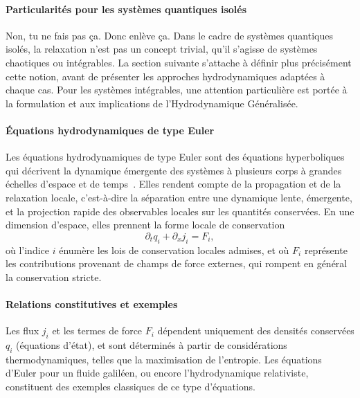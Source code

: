 \paragraph{Particularités pour les systèmes quantiques isolés}  
{\color{blue} Non, tu ne fais pas ça. Donc enlève ça.}
Dans le cadre de systèmes quantiques isolés, la relaxation n’est pas un concept trivial, qu’il s’agisse de systèmes chaotiques ou intégrables. La section suivante s’attache à définir plus précisément cette notion, avant de présenter les approches hydrodynamiques adaptées à chaque cas. Pour les systèmes intégrables, une attention particulière est portée à la formulation et aux implications de l’Hydrodynamique Généralisée.

\paragraph{Équations hydrodynamiques de type Euler}  
Les équations hydrodynamiques de type Euler sont des équations hyperboliques qui décrivent la dynamique émergente des systèmes à plusieurs corps à grandes échelles d’espace et de temps~\cite{ref1}. Elles rendent compte de la propagation {\color{blue} et } de la relaxation locale, c’est-à-dire la séparation entre une dynamique lente, émergente, et la projection rapide des observables locales sur les quantités conservées. En une dimension d’espace, elles prennent la forme locale de conservation
\begin{equation}\label{chap:GHD:eq.conserv.1}
	\partial_t q_i + \partial_x j_i = F_i,	
\end{equation}
où l’indice $i$ énumère les lois de conservation locales admises, et où $F_i$ représente les contributions provenant de champs de force externes, qui rompent en général la conservation stricte.

\paragraph{Relations constitutives et exemples}  
Les flux $j_i$ et les termes de force $F_i$ dépendent uniquement des densités conservées $q_i$ (équations d’état), et sont déterminés à partir de considérations thermodynamiques, telles que la maximisation de l’entropie. Les équations d’Euler pour un fluide galiléen, ou encore l’hydrodynamique relativiste, constituent des exemples classiques de ce type d’équations.

